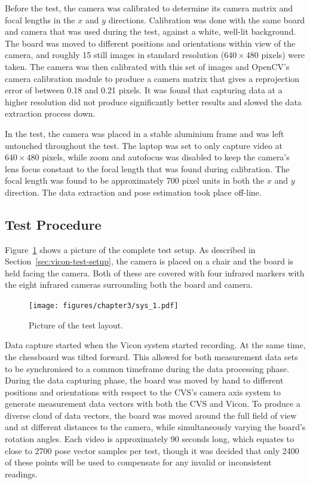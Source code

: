 Before the test, the camera was calibrated to determine its camera matrix and focal lengths in the $x$ and $y$ directions. Calibration was done with the same board and camera that was used during the test, against a white, well-lit background. The board was moved to different positions and orientations within view of the camera, and roughly 15 still images in standard resolution ($640\times480$ pixels) were taken. The camera was then calibrated with this set of images and OpenCV's camera calibration module to produce a camera matrix that gives a reprojection error of between 0.18 and 0.21 pixels. It was found that capturing data at a higher resolution did not produce significantly better results and slowed the data extraction process down. 

In the test, the camera was placed in a stable aluminium frame and was left untouched throughout the test. The laptop was set to only capture video at $640\times480$ pixels, while zoom and autofocus was disabled to keep the camera's lens focus constant to the focal length that was found during calibration. The focal length was found to be approximately 700 pixel units in both the $x$ and $y$ direction. The data extraction and pose estimation took place off-line. 

\subsection{Test Procedure}

Figure~\ref{fig:chap3-pic-sys-layout} shows a picture of the complete test setup. As described in Section~\ref{sec:vicon-test-setup}, the camera is placed on a chair and the board is held facing the camera. Both of these are covered with four infrared markers with the eight infrared cameras surrounding both the board and camera.  

\begin{figure}
  \centering
  \texttt{[image: figures/chapter3/sys\_1.pdf]}
  \caption{Picture of the test layout.}
\label{fig:chap3-pic-sys-layout}
\end{figure}

Data capture started when the Vicon system started recording. At the same time, the chessboard was tilted forward. This allowed for both measurement data sets to be synchronised to a common timeframe during the data processing phase. During the data capturing phase, the board was moved by hand to different positions and orientations with respect to the CVS's camera axis system to generate measurement data vectors with both the CVS and Vicon. To produce a diverse cloud of data vectors, the board was moved around the full field of view and at different distances to the camera, while simultaneously varying the board's rotation angles. Each video is approximately 90 seconds long, which equates to close to 2700 pose vector samples per test, though it was decided that only 2400 of these points will be used to compensate for any invalid or inconsistent readings. 

